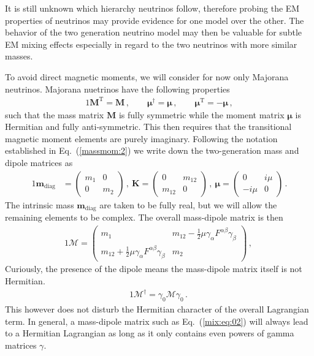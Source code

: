 \documentclass[a4paper]{article}
\newcommand*{\bb}{\boldsymbol}
\newcommand{\req}[1]{Eq.~(\ref{#1})}
\begin{document}
It is still unknown which hierarchy neutrinos follow, therefore probing the EM properties of neutrinos may provide evidence for one model over the other. The behavior of the two generation neutrino model may then be valuable for subtle EM mixing effects especially in regard to the two neutrinos with more similar masses.

To avoid direct magnetic moments, we will consider for now only Majorana neutrinos. Majorana nuetrinos have the following properties
\begin{alignat}{1}
	\label{mix:eq:00a}	\bb{M}^{\mathrm{T}}=\bb{M}\,,\qquad
    \bb{\mu}^{\dagger}=\bb{\mu}\,,\qquad
    \bb{\mu}^{\mathrm{T}}=-\bb{\mu}\,,
\end{alignat}
such that the mass matrix $\bb{M}$ is fully symmetric while the moment matrix $\bb{\mu}$ is Hermitian and fully anti-symmetric. This then requires that the transitional magnetic moment elements are purely imaginary. Following the notation established in \req{massmom:2} we write down the two-generation mass and dipole matrices as
\begin{alignat}{1}
	\label{mix:eq:01a} \bb{m}_\mathrm{diag} &= 
	\begin{pmatrix}
		m_{1} & 0\\
		0 & m_{2}
	\end{pmatrix}\,,\ 
	\bb{K} = 
	\begin{pmatrix}
		0 & m_{12}\\
		m_{12} & 0
	\end{pmatrix}\,,\ 
	\bb{\mu} = 
	\begin{pmatrix}
		0 & i\mu\\
		-i\mu & 0
	\end{pmatrix}\,.
\end{alignat}
The intrinsic mass $\bb{m}_\mathrm{diag}$ are taken to be fully real, but we will allow the remaining elements to be complex. The overall mass-dipole matrix is then
\begin{alignat}{1}
	\label{mix:eq:02} \bb{\mathcal{M}} = 
	\begin{pmatrix}
		m_{1} & m_{12}-\frac{1}{2}\mu\gamma_{\alpha}F^{\alpha\beta}\gamma_{\beta}\\
		m_{12}+\frac{1}{2}\mu\gamma_{\alpha}F^{\alpha\beta}\gamma_{\beta} & m_{2}
	\end{pmatrix}\,,\ 
\end{alignat}
Curiously, the presence of the dipole means the mass-dipole matrix itself is not Hermitian.
\begin{alignat}{1}
	\label{mix:eq:03} \bb{\mathcal{M}}^{\dagger} = \gamma_{0}\bb{\mathcal{M}}\gamma_{0}\,.\ 
\end{alignat}
This however does not disturb the Hermitian character of the overall Lagrangian term. In general, a mass-dipole matrix such as \req{mix:eq:02} will always lead to a Hermitian Lagrangian as long as it only contains even powers of gamma matrices $\gamma$.
\end{document}
